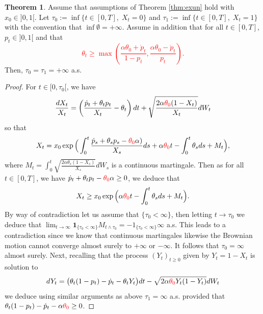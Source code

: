 \documentclass[11pt]{article}
\theoremstyle{definition}
\newtheorem{Thm}[Def]{Theorem}
\newcommand{\red}{\textcolor{red}}
\begin{document}
\begin{Thm}\label{thm:mod2}
Assume that assumptions of Theorem \ref{thm:exun} hold with $x_0\in]0,1[$.
Let $\tau_0:=\inf \{t\in[0,T],\; X_t=0\}$ and  $\tau_1:=\inf \{t\in[0,T],\; X_t=1\}$ with the convention that $\inf\emptyset=+\infty$. Assume in addition that for all $t\in[0,T]$,  $p_t\in]0,1[$ and that
\red{
\begin{equation}\label{Assumption:3}
\theta_t\geq \max\left(\frac{\alpha\theta_0+\dot p_t}{1-p_t},\frac{\alpha\theta_0-\dot p_t}{p_t}\right)\tag{C}. 
\end{equation}
}
 Then, $\tau_0=\tau_1=+\infty$ a.s.
\end{Thm}

\begin{proof}
For $t\in[0,\tau_0[$, we have 
$$
\frac{dX_t}{X_t}= \left(\frac{\dot p_t +\theta_t p_t}{X_t} - \theta_t\right)dt  +\sqrt{\frac{2\alpha \red{\theta_0}(1-X_t)}{X_t}} dW_t 
$$  
so that
$$
X_t=x_0\exp\Big(\int_0^t \frac{\dot p_s +\theta_sp_s- \red{\theta_0}\alpha)}{X_s}ds+\alpha\red{\theta_0}t-  \int_0^t\theta_sds + M_t\Big),
$$
where $M_t=\int_0^t\sqrt{\frac{2\alpha \theta_s(1-X_s)}{X_s}} dW_s$ is a continuous martingale. Then as for all $t\in[0,T]$, we have $\dot p_t +\theta_tp_t- \red{\theta_0}\alpha\ge0$, we deduce that
$$
X_t\ge x_0\exp\Big(\alpha\red{\theta_0}t-  \int_0^t\theta_sds + M_t\Big).
$$
By way of contradiction let us assume that  $\{\tau_0<\infty\}$, then letting $t\to \tau_0$ we deduce that $\lim_{t\to \infty} \mathbf 1_{\{\tau_0<\infty\}}M_{t\wedge \tau_0}=\mathbf -1_{\{\tau_0<\infty\}}\infty$ a.s. This leads to a contradiction since we know that continuous martingales likewise the Brownian motion cannot converge  almost surely to $+\infty$ or $-\infty$. It follows that $\tau_0=\infty$ almost surely. Next, recalling that  the process $(Y_t)_{t\geq 0}$  given by $Y_t=1-X_t$ is solution to 
$$
dY_t= \big( \theta_t(1-p_t) -\dot p_t - \theta_tY_t  \big)dt  -\sqrt{2\alpha \red{\theta_0}Y_t(1-Y_t)} dW_t 
$$
we deduce using similar arguments as above 
$\tau_1=\infty$ a.s. provided that $\theta_t(1-p_t) -\dot p_t -\alpha \red{\theta_0}\ge 0$.
 \end{proof}
\end{document}
